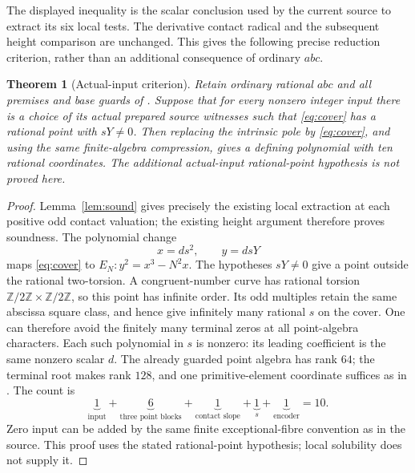 \documentclass[11pt]{article}
\newcommand{\Z}{\mathbb Z}
\newtheorem{theorem}{Theorem}
\theoremstyle{remark}\newtheorem{remark}[theorem]{Remark}
\begin{document}
The displayed inequality is the scalar conclusion used by the current
source to extract its six local tests. The derivative contact radical and
the subsequent height comparison are unchanged. This gives the following
precise reduction criterion, rather than an additional consequence of
ordinary \(abc\).

\begin{theorem}[Actual-input criterion]\label{thm:criterion}
Retain ordinary rational \(abc\) and all premises and base guards of
\cite{eleven}. Suppose that for every nonzero integer input there is a
choice of its actual prepared source witnesses such that
\eqref{eq:cover} has a rational point with \(sY\ne0\). Then replacing the
intrinsic pole by \eqref{eq:cover}, and using the same finite-algebra
compression, gives a defining polynomial with ten rational coordinates.
The additional actual-input rational-point hypothesis is not proved here.
\end{theorem}
\begin{proof}
Lemma~\ref{lem:sound} gives precisely the existing local extraction at each
positive odd contact valuation; the existing height argument therefore
proves soundness. The polynomial change
\begin{equation}\label{eq:map}
 x=d s^2,\qquad y=d sY
\end{equation}
maps \eqref{eq:cover} to \(E_N:y^2=x^3-N^2x\).
The hypotheses \(sY\ne0\) give a point outside the rational two-torsion.
A congruent-number curve has rational torsion \(\Z/2\Z\times\Z/2\Z\),
so this point has infinite order. Its odd multiples retain the same
abscissa square class, and hence give infinitely many rational \(s\)
on the cover. One can therefore avoid the finitely many terminal zeros
at all point-algebra characters. Each such polynomial in \(s\) is nonzero:
its leading coefficient is the same nonzero scalar \(d\).
The already guarded point algebra has rank \(64\); the terminal root
makes rank \(128\), and one primitive-element coordinate suffices as in
\cite{encoder}. The count is
\[
 \underbrace{1}_{\text{input}}+
 \underbrace{6}_{\text{three point blocks}}+
 \underbrace{1}_{\text{contact slope}}+
 \underbrace{1}_{s}+
 \underbrace{1}_{\text{encoder}}=10.
\]
Zero input can be added by the same finite exceptional-fibre convention
as in the source. This proof uses the stated rational-point hypothesis;
local solubility does not supply it.
\end{proof}
\end{document}
